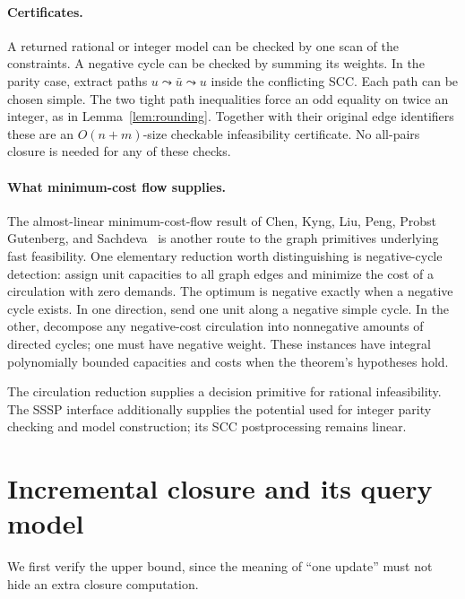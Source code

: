 \documentclass[manuscript,11pt,screen,nonacm]{acmart}
\theoremstyle{definition}
\begin{document}
\paragraph{Certificates.}
A returned rational or integer model can be checked by one scan of the constraints. A negative cycle can be checked by summing its weights. In the parity case, extract paths $u\leadsto\bar u\leadsto u$ inside the conflicting SCC. Each path can be chosen simple. The two tight path inequalities force an odd equality on twice an integer, as in Lemma~\ref{lem:rounding}. Together with their original edge identifiers these are an $O(n+m)$-size checkable infeasibility certificate. No all-pairs closure is needed for any of these checks.

\paragraph{What minimum-cost flow supplies.}
The almost-linear minimum-cost-flow result of Chen, Kyng, Liu, Peng, Probst Gutenberg, and Sachdeva~\cite{flow2022} is another route to the graph primitives underlying fast feasibility. One elementary reduction worth distinguishing is negative-cycle detection: assign unit capacities to all graph edges and minimize the cost of a circulation with zero demands. The optimum is negative exactly when a negative cycle exists. In one direction, send one unit along a negative simple cycle. In the other, decompose any negative-cost circulation into nonnegative amounts of directed cycles; one must have negative weight. These instances have integral polynomially bounded capacities and costs when the theorem's hypotheses hold.

The circulation reduction supplies a decision primitive for rational infeasibility. The SSSP interface additionally supplies the potential used for integer parity checking and model construction; its SCC postprocessing remains linear.

\section{Incremental closure and its query model}\label{sec:incremental}
We first verify the upper bound, since the meaning of ``one update'' must not hide an extra closure computation.
\end{document}
